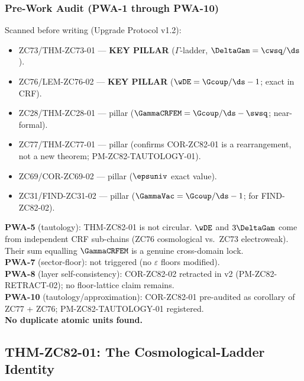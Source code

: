 \documentclass[12pt, a4paper]{article}
\begin{document}
\subsubsection{Pre-Work Audit (PWA-1 through PWA-10)}

\begin{formalbox}[title={Pre-Work Audit Record --- ZC82}]
Scanned before writing (Upgrade Protocol v1.2):
\begin{itemize}[leftmargin=2em, noitemsep]
  \item ZC73/THM-ZC73-01 --- \textbf{KEY PILLAR}
    ($\Gamma$-ladder, $\DeltaGam = \cwsq/\ds$).
  \item ZC76/LEM-ZC76-02 --- \textbf{KEY PILLAR}
    ($\wDE = \Gcoup/\ds - 1$; exact in CRF).
  \item ZC28/THM-ZC28-01 --- pillar
    ($\GammaCRFEM = \Gcoup/\ds - \swsq$; near-formal).
  \item ZC77/THM-ZC77-01 --- pillar (confirms COR-ZC82-01 is
    a rearrangement, not a new theorem; PM-ZC82-TAUTOLOGY-01).
  \item ZC69/COR-ZC69-02 --- pillar ($\epsuniv$ exact value).
  \item ZC31/FIND-ZC31-02 --- pillar ($\GammaVac = \Gcoup/\ds - 1$;
    for FIND-ZC82-02).
\end{itemize}

\textbf{PWA-5} (tautology): THM-ZC82-01 is not circular.
$\wDE$ and $3\DeltaGam$ come from independent CRF sub-chains
(ZC76 cosmological vs.\ ZC73 electroweak). Their sum equalling
$\GammaCRFEM$ is a genuine cross-domain lock.\\
\textbf{PWA-7} (sector-floor): not triggered (no $\varepsilon$
floors modified).\\
\textbf{PWA-8} (layer self-consistency): COR-ZC82-02 retracted in
v2 (PM-ZC82-RETRACT-02); no floor-lattice claim remains.\\
\textbf{PWA-10} (tautology/approximation): COR-ZC82-01 pre-audited
as corollary of ZC77 + ZC76; PM-ZC82-TAUTOLOGY-01 registered.\\
\textbf{No duplicate atomic units found.}
\end{formalbox}

\newpage

\subsection{THM-ZC82-01: The Cosmological-Ladder Identity}
\label{sec:thm01}
\end{document}
